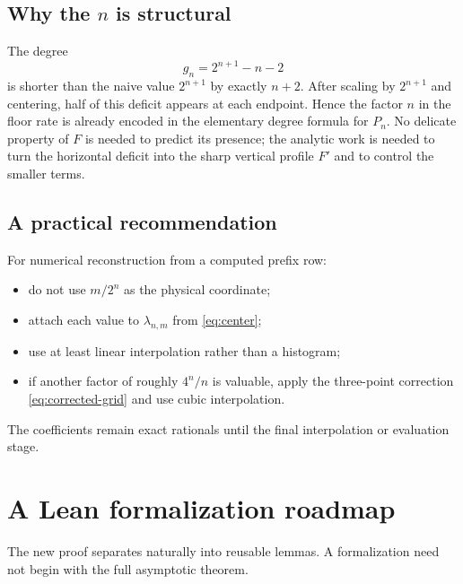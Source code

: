 \documentclass[11pt,oneside]{article}
\theoremstyle{definition}
\theoremstyle{remark}
\begin{document}
\subsection{Why the \texorpdfstring{$n$}{n} is structural}

The degree
\begin{equation}
 g_n=2^{n+1}-n-2
\end{equation}
is shorter than the naive value $2^{n+1}$ by exactly $n+2$.  After scaling by
$2^{n+1}$ and centering, half of this deficit appears at each endpoint.  Hence the factor $n$
in the floor rate is already encoded in the elementary degree formula for $P_n$.  No delicate
property of $F$ is needed to predict its presence; the analytic work is needed to turn the
horizontal deficit into the sharp vertical profile $F'$ and to control the smaller terms.

\subsection{A practical recommendation}

For numerical reconstruction from a computed prefix row:
\begin{itemize}
\item do not use $m/2^n$ as the physical coordinate;
\item attach each value to $\lambda_{n,m}$ from \eqref{eq:center};
\item use at least linear interpolation rather than a histogram;
\item if another factor of roughly $4^n/n$ is valuable, apply the three-point correction
      \eqref{eq:corrected-grid} and use cubic interpolation.
\end{itemize}
The coefficients remain exact rationals until the final interpolation or evaluation stage.

\section{A Lean formalization roadmap}
\label{sec:lean-roadmap}

The new proof separates naturally into reusable lemmas.  A formalization need not begin with
the full asymptotic theorem.
\end{document}
